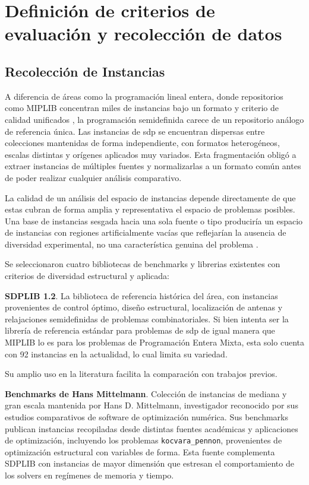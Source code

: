 \chapter{Definición de criterios de evaluación y recolección de datos}
\label{ch:recoleccion}

\section{Recolección de Instancias}
\label{sec:recoleccion_instancias}

A diferencia de áreas como la programación lineal entera, donde repositorios como MIPLIB
concentran miles de instancias bajo un formato y criterio de calidad unificados \cite{gleixnerMIPLIB2017Datadriven2021}, 
la programación semidefinida carece de un repositorio análogo de referencia única. Las instancias de \acrshort{sdp} 
se encuentran dispersas entre colecciones mantenidas de forma independiente, con formatos heterogéneos, escalas 
distintas y orígenes aplicados muy variados. Esta fragmentación obligó a extraer instancias de múltiples fuentes y 
normalizarlas a un formato común antes de poder realizar cualquier análisis comparativo.

La calidad de un análisis del espacio de instancias depende directamente de que estas cubran de forma amplia y
representativa el espacio de problemas posibles. Una base de instancias sesgada
hacia una sola fuente o tipo produciría un espacio de instancias con regiones artificialmente vacías que reflejarían
la ausencia de diversidad experimental, no una característica genuina del problema \cite{smith-milesInstanceSpaceAnalysis2023}.

Se seleccionaron cuatro bibliotecas de benchmarks y librerias existentes con criterios de diversidad estructural y aplicada:

\textbf{SDPLIB 1.2}\cite{borchersSDPLIB12Library1999}. La biblioteca de referencia histórica del área, con
instancias provenientes de control óptimo, diseño estructural, localización de antenas y relajaciones semidefinidas
de problemas combinatoriales. Si bien intenta ser la librería de referencia estándar para problemas de \acrshort{sdp}
de igual manera que MIPLIB lo es para los problemas de Programación Entera Mixta, esta solo cuenta con 92 instancias en la actualidad,
lo cual limita su variedad.

Su amplio uso en la literatura facilita la comparación con trabajos previos.

\textbf{Benchmarks de Hans Mittelmann}\cite{PlatoasueduFtpSparse_sdphtml}. Colección de instancias de
mediana y gran escala mantenida por Hans D. Mittelmann, investigador reconocido por sus estudios comparativos
de software de optimización numérica. Sus benchmarks publican instancias recopiladas desde distintas fuentes
académicas y aplicaciones de optimización, incluyendo los problemas \texttt{kocvara\_pennon}, provenientes
de optimización estructural con variables de forma. Esta fuente complementa SDPLIB con instancias de mayor
dimensión que estresan el comportamiento de los solvers en regímenes de memoria y tiempo.


